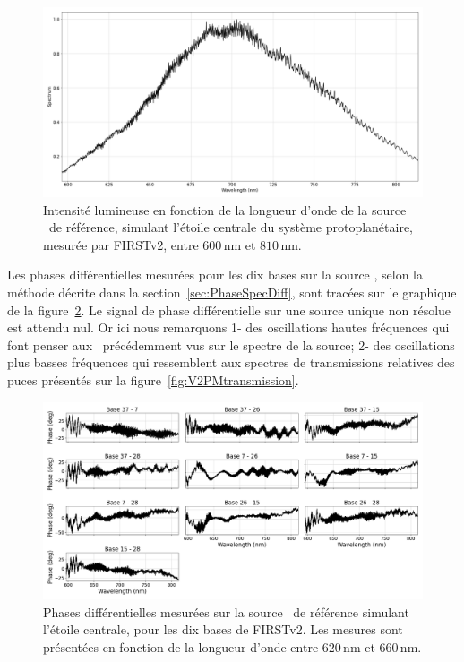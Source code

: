 \begin{figure}[ht!]
    \centering
    \includegraphics[width=\figwidth]{Figure_Chap4/20221010_Bin01_Spectra_superK_Pola1_LaTex.png}
    \caption[Intensité lumineuse en fonction de la longueur d'onde de la source de référence (\sk) mesurée par FIRSTv2.]{Intensité lumineuse en fonction de la longueur d'onde de la source \sk~de référence, simulant l'étoile centrale du système protoplanétaire, mesurée par FIRSTv2, entre $600 \,$nm et $810 \,$nm.}
    \label{fig:SuperKSpectrum}
\end{figure}

Les phases différentielles mesurées pour les dix bases sur la source \sk, selon la méthode décrite dans la section~\ref{sec:PhaseSpecDiff}, sont tracées sur le graphique de la figure~\ref{fig:PhaseDiffSuperK}. Le signal de phase différentielle sur une source unique non résolue est attendu nul. Or ici nous remarquons 1- des oscillations hautes fréquences qui font penser aux \wiggles~précédemment vus sur le spectre de la source; 2- des oscillations plus basses fréquences qui ressemblent aux spectres de transmissions relatives des puces présentés sur la figure~\ref{fig:V2PMtransmission}.

\begin{figure}[ht!]
    \centering
    \includegraphics[width=\figwidth]{Figure_Chap4/20221010_SpeDiffPhase_BaseSubplot_Pola1_LaTex.png}
    \caption[Phases différentielles mesurées sur la source \sk~de référence simulant l'étoile centrale.]{Phases différentielles mesurées sur la source \sk~de référence simulant l'étoile centrale, pour les dix bases de FIRSTv2. Les mesures sont présentées en fonction de la longueur d'onde entre $620 \,$nm et $660 \,$nm.}
    \label{fig:PhaseDiffSuperK}
\end{figure}

